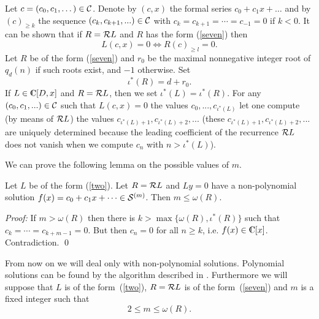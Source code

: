 Let $c=(c_0,c_1,\dots)\in{\cal C}$. Denote by $(c,x)$ the formal series
$c_0+c_1x+\dots$ and by $(c)_{\geq k}$ the sequence
$(c_k,c_{k+1},...)\in {\cal C}$ with $c_k=c_{k+1}=\cdots =c_{-1}=0$ if
$k<0$. It can be shown that if $R={\cal R} L$ and $R$ has the form
(\ref{seven}) then
\begin{equation}
\label{eleven}
L(c,x)=0 \Leftrightarrow R(c)_{\geq l}=0.
\end{equation}
Let $R$ be of the form (\ref{seven}) and
$r_0$ be the maximal nonnegative integer root of $q_d(n)$ if such
roots exist, and $-1$ otherwise. Set
$$\iota ^* (R)= d+r_0.$$
If $L \in \rodtp$ and $R= {\cal R} L$, then we set
$\iota ^*(L)= \iota ^*(R)$.
For any $(c_0,c_1,...)\in {\cal C}$ such that $L(c,x)=0$ the values
$c_0,...,c_{\iota ^*(L)}$ let one compute (by means of ${\cal R} L$) the
values $c_{\iota ^*(L)+1}, c_{\iota ^*(L)+2},...$
(these
$c_{\iota ^*(L)+1}, c_{\iota ^*(L)+2},...$
are uniquely determined  because the leading
coefficient of the recurrence ${\cal R} L$ does not vanish when we
compute $c_n$ with $n>\iota ^*(L)$).

We can prove the following
lemma on the possible values of $m$.

\begin{Lemma}
\label{valm}
Let $L$ be of the form (\ref{two}). Let $R= {\cal R} L$ and
$Ly=0$ have a non-polynomial solution $f(x)=c_0+c_1x+\cdots \in
{\cal S} ^{(m)}$.  Then $m\leq \omega (R)$.
\end{Lemma}
{\em Proof:\/} If $m> \omega (R)$ then
there is  $k>\max \{\omega (R), \iota ^* (R)\}$ such
that $c_k=\cdots=c_{k+m-1}=0$. But then $c_n=0$ for all $n\ge k$, i.e.
$f(x)\in \complex [x]$. Contradiction. \qed


{}From now on we will deal only with non-polynomial solutions.
Polynomial solutions
can be found by the algorithm described in \cite{ABP}. Furthermore
we will suppose that $L$ is of the form~(\ref{two}), $R={\cal R}L$
is of the form~(\ref{seven}) and $m$ is a fixed integer such that
\begin{equation}
\label{twelve}
2\le m\le \omega (R).
\end{equation}

